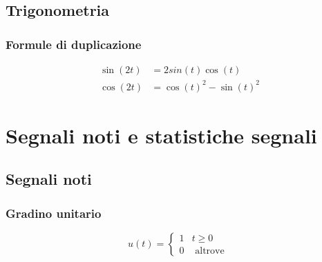 \subsection{Trigonometria}
\subsubsection*{Formule di duplicazione}
\begin{align*}
	\sin \left(2t\right) & = 2sin\left(t\right) \cos \left(t\right)         \\
	\cos \left(2t\right) & = \cos \left(t\right)^2  - \sin \left(t\right)^2
\end{align*}



\section{Segnali noti e statistiche segnali}
\subsection{Segnali noti}

\subsubsection*{Gradino unitario}
\begin{minipage}[c]{0.48\textwidth}
	\[
		u\left(t\right)   =
		\begin{cases}
			1 & t \ge 0          \\
			0 & \text{ altrove }
		\end{cases}
	\]
\end{minipage}
%
\begin{minipage}[c]{0.48\textwidth}
\end{minipage}
